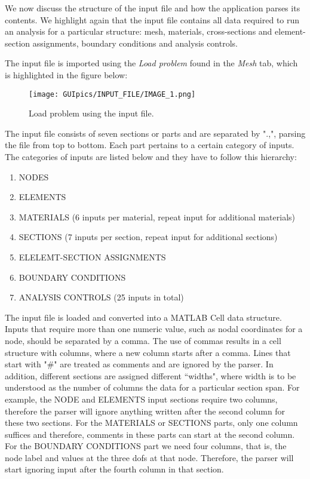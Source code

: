 We now discuss the structure of the input file and how the application parses 
its contents. We highlight again that the input file contains all data required 
to run an analysis for a particular structure: mesh, materials, cross-sections 
and element-section assignments, boundary conditions and analysis controls.

The input file is imported using the \textit{Load problem} found in the 
\textit{Mesh} tab, which is highlighted in the figure below:

\begin{figure}
	\centering
	\texttt{[image: GUIpics/INPUT\_FILE/IMAGE\_1.png]}
	\caption{Load problem using the input file.}
	\label{fig:IMAGE_1}
\end{figure}

The input file consists of seven sections or parts and are separated by ".,", 
parsing the file from top to bottom. Each part pertains to a certain category 
of inputs. The categories of inputs are listed below and they have to follow 
this hierarchy:

\begin{enumerate}
	\item NODES
	\item ELEMENTS
	\item MATERIALS (6 inputs per material, repeat input for additional 
	materials)
	\item SECTIONS (7 inputs per section, repeat input for additional sections)
	\item ELELEMT-SECTION ASSIGNMENTS
	\item BOUNDARY CONDITIONS
	\item ANALYSIS CONTROLS (25 inputs in total)
\end{enumerate}

The input file is loaded and converted into a MATLAB Cell data structure. 
Inputs that require more than one numeric value, such as nodal coordinates for 
a node, should be separated by a comma. The use of commas results in a cell 
structure with columns, where a new column starts after a comma. Lines that 
start with "$\#$" are treated as comments and are 
ignored by the parser. In addition, different sections are assigned different 
``widths", where width is to be understood as the number of columns the data 
for a particular section span. For example, the NODE and ELEMENTS input 
sections require two columns, therefore the parser will ignore anything written 
after the second column for these two sections. For the MATERIALS or SECTIONS 
parts, only one column suffices and therefore, comments in these parts can 
start at the second column. For the BOUNDARY CONDITIONS part we need four 
columns, that is, the node label and values at the three \acrshort{dof}s at 
that node. Therefore, the parser will start ignoring input after the fourth 
column in that section. 

